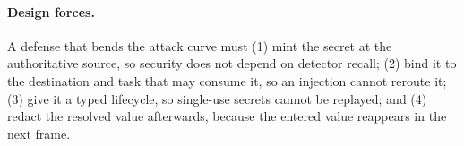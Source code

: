 \paragraph{Design forces.} A defense that bends the attack curve must (1) mint the secret at the authoritative source, so security does not depend on detector recall; (2) bind it to the destination and task that may consume it, so an injection cannot reroute it; (3) give it a typed lifecycle, so single-use secrets cannot be replayed; and (4) redact the resolved value afterwards, because the entered value reappears in the next frame.
